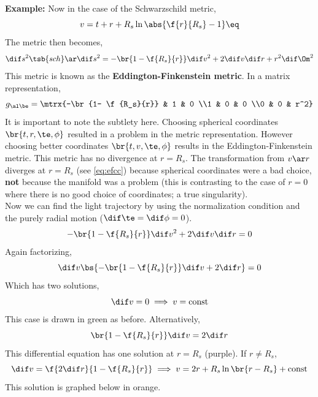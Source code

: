 \documentclass{article}
\begin{document}
\textbf{Example:} Now in the case of the Schwarzschild metric,
\[ v = t+r + R_s \ln \abs{\f{r}{R_s} - 1} \eq \label{eq:efcc}\]
The metric then becomes,
\[ \dif s^2\tsb{sch} \ar \dif s^2 = - \br{1- \f{R_s}{r}} \dif v^2 + 2 \dif v \dif r + r^2 \dif \Om^2 \]
This metric is known as the \textbf{Eddington-Finkenstein metric}. In a matrix representation,
\[ g_{\al\be} = \mtrx{-\br{1- \f{R_s}{r}} & 1 & 0 \\1 & 0 & 0 \\0 & 0 & r^2} \]
It is important to note the subtlety here. Choosing spherical coordinates $\br{t, r, \te, \phi}$ resulted in a problem in the metric representation. However choosing better coordinates $\br{t, v, \te, \phi}$ results in the Eddington-Finkenstein metric. This metric has no divergence at $r = R_s$. The transformation from $v \ar r$ diverges at $r = R_s$ (see \eqref{eq:efcc}) because spherical coordinates were a bad choice, \textbf{not} because the manifold was a problem (this is contrasting to the case of $r=0$ where there is no good choice of coordinates; a true singularity). \\

Now we can find the light trajectory by using the normalization condition and the purely radial motion ($\dif \te = \dif \phi = 0 $).
\[ - \br{1- \f{R_s}{r}}  \dif v^2 + 2 \dif v \dif r = 0 \]
Again factorizing,
\[ \dif v \bs{- \br{1- \f{R_s}{r}}  \dif v + 2 \dif r} = 0 \]
Which has two solutions,
\[ \dif v = 0 \implies v = \text{const} \]
This case is drawn in green as before. Alternatively,
\[ \br{1 - \f{R_s}{r}} \dif v = 2 \dif r \]
This differential equation has one solution at $r = R_s$ (purple). If $r \neq R_s$,
\[ \dif v = \f{2 \dif r}{ 1 - \f{R_s}{r}} \implies v = 2 r + R_s \ln\br{r - R_s} + \text{const} \]
This solution is graphed below in orange.
\begin{center}
\end{center}
\end{document}
